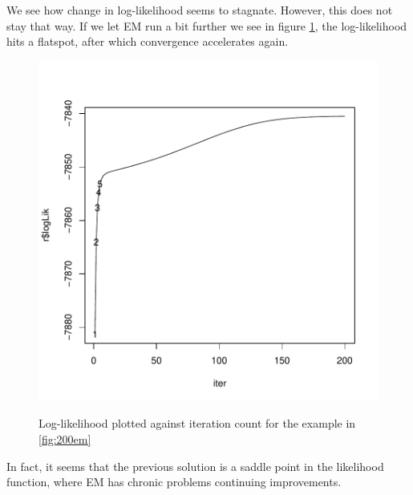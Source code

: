 We see how change in log-likelihood seems to stagnate. However, this does not 
stay that way. If we let EM run a bit further we see in figure \ref{fig:emll}, the log-likelihood hits 
a flatspot, after which convergence accelerates again.

\begin{figure}[h]
    \begin{Rgraph}[0.9]
\includegraphics{chapter1-figemll}
    \label{fig:emll}
    \caption{Log-likelihood plotted against iteration count for the example in 
             \ref{fig:200em}}
    \end{Rgraph}
\end{figure}

In fact, it seems that the previous solution is a saddle point in the likelihood
function, where EM has chronic problems continuing improvements.
